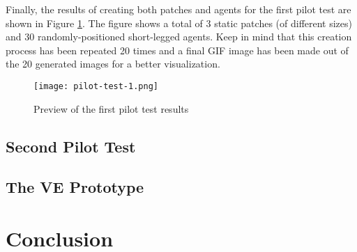 Finally, the results of creating both patches and agents for the first pilot test are shown in Figure \ref{fig:pilot-test-1}. The figure shows a total of 3 static patches (of different sizes) and 30 randomly-positioned short-legged agents. Keep in mind that this creation process has been repeated 20 times and a final GIF image has been made out of the 20 generated images for a better visualization.

\begin{figure}[h!]
    \centering
    \texttt{[image: pilot-test-1.png]}
    \caption{Preview of the first pilot test results}
    \label{fig:pilot-test-1}
\end{figure}

\subsection{Second Pilot Test}

\subsection{The VE Prototype}

\section{Conclusion}

